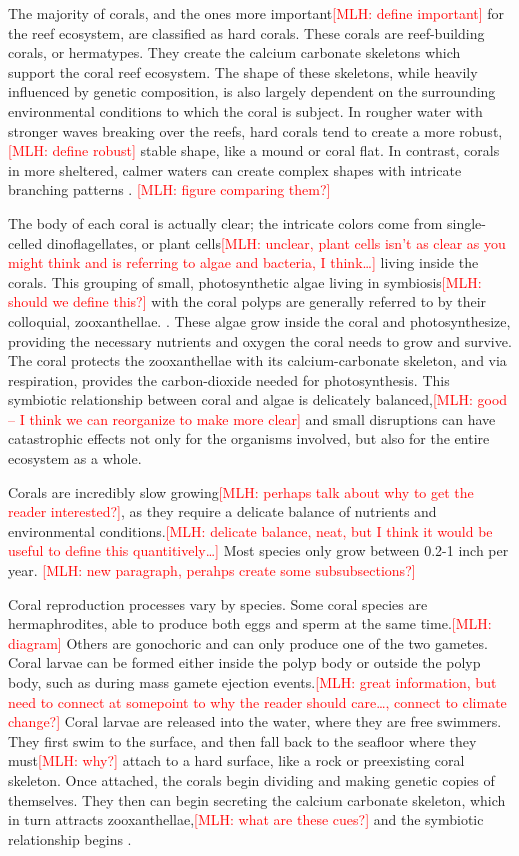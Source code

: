 \documentclass{book}\usepackage{knitr}
\newcommand{\red}[1]{\textcolor{red}{[MLH: #1]}}
\begin{document}
{The majority of corals, and the ones more important\red{define important} for the reef ecosystem, are classified as hard corals. These corals are reef-building corals, or hermatypes. They create the calcium carbonate skeletons which support the coral reef ecosystem. The shape of these skeletons, while heavily influenced by genetic composition, is also largely dependent on the surrounding environmental conditions to which the coral is subject. In rougher water with stronger waves breaking over the reefs, hard corals tend to create a more robust,\red{define robust} stable shape, like a mound or coral flat. In contrast, corals in more sheltered, calmer waters can create complex shapes with intricate branching patterns \citep{coralreefalliance_2021}.  \red{figure comparing them?}

The body of each coral is actually clear; the intricate colors come from single-celled dinoflagellates, or plant cells\red{unclear, plant cells isn't as clear as you might think and is referring to algae and bacteria, I think\ldots} living inside the corals. This grouping of small, photosynthetic algae living in symbiosis\red{should we define this?} with the coral polyps are generally referred to by their colloquial, zooxanthellae. \citep{noaa}. These algae grow inside the coral and photosynthesize, providing the necessary nutrients and oxygen the coral needs to grow and survive. The coral protects the zooxanthellae with its calcium-carbonate skeleton, and via respiration, provides the carbon-dioxide needed for photosynthesis. This symbiotic relationship between coral and algae is delicately balanced,\red{good -- I think we can reorganize to make more clear} and small disruptions can have catastrophic effects not only for the organisms involved, but also for the entire ecosystem as a whole. \citep{https://doi.org/10.1002/fee.2088}  

Corals are incredibly slow growing\red{perhaps talk about why to get the reader interested?}, as they require a delicate balance of nutrients and environmental conditions.\red{delicate balance, neat, but I think it would be useful to define this quantitively\ldots} Most species only grow between 0.2-1 inch per year. \red{new paragraph, perahps create some subsubsections?}

Coral reproduction processes vary by species. Some coral species are hermaphrodites, able to produce both eggs and sperm at the same time.\red{diagram} Others are gonochoric and can only produce one of the two gametes. Coral larvae can be formed either inside the polyp body or outside the polyp body, such as during mass gamete ejection events.\red{great information, but need to connect at somepoint to why the reader should care\ldots, connect to climate change?} Coral larvae are released into the water, where they are free swimmers. They first swim to the surface, and then fall back to the seafloor where they must\red{why?}  attach to a hard surface, like a rock or preexisting coral skeleton. Once attached, the corals begin dividing and making genetic copies of themselves. They then can begin secreting the calcium carbonate skeleton, which in turn attracts zooxanthellae,\red{what are these cues?} and the symbiotic relationship begins \citep{coralreefalliance_2021}.

}
\end{document}
